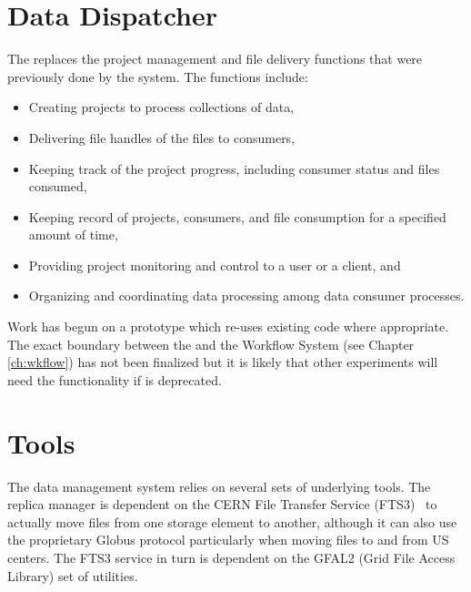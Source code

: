 \documentclass[../main-v1.tex]{subfiles}
\begin{document}
\section{Data Dispatcher }

The  replaces the project management and file delivery functions that were previously done by the  system.  The  functions include:
\begin{itemize}
    \item Creating projects to process collections of data,
    
    \item Delivering file handles of the files to consumers,
    
    \item Keeping track of the project progress, including consumer status and files consumed,
    
    \item Keeping record of projects, consumers, and file consumption for a specified amount of time,
    
    \item Providing project monitoring and control to a user or a client, and
    
    \item Organizing and coordinating data processing among data consumer processes.

\end{itemize}

Work has begun on a prototype  which re-uses existing  code where appropriate.  The exact boundary between the  and the Workflow System (see Chapter \ref{ch:wkflow}) has not been finalized but it is likely that other  experiments will need the  functionality if  is deprecated. 



\section{Tools }

The data management system relies on several sets of underlying tools.  The  replica manager is dependent on the CERN File Transfer Service (FTS3)~\cite{Kiryanov:2015fts} to actually move files from one storage element to another, although it can also use the proprietary
Globus protocol 
particularly when moving files to and from US  centers.  The FTS3 service in turn is dependent on the
GFAL2 (Grid File Access Library) set of utilities.
\end{document}
